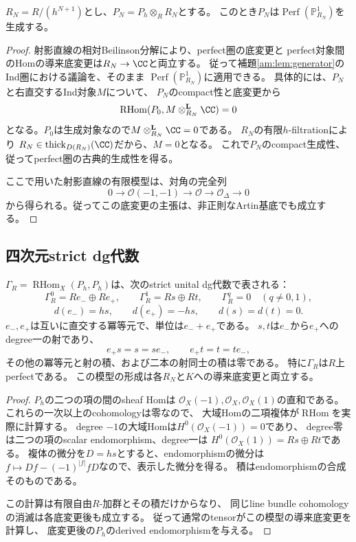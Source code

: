 \begin{lemma}[各有限切断では生成する]\label{as:lem:artin-generation}
$R_N=R/(h^{N+1})$とし、$P_N=P_h\otimes_RR_N$とする。
このとき$P_N$は$\operatorname{Perf}(\mathbb P^1_{R_N})$を生成する。
\end{lemma}
\begin{proof}
射影直線の相対Beilinson分解により、perfect圏の底変更と
perfect対象間のHomの導来底変更は$R_N\to\CC$と両立する。
従って補題\ref{am:lem:generator}のInd圏における議論を、そのまま
$\operatorname{Perf}(\mathbb P^1_{R_N})$に適用できる。
具体的には、$P_N$と右直交するInd対象$M$について、
$P_N$のcompact性と底変更から
\[
 \operatorname{RHom}(P_0,M\otimes_{R_N}^{\mathbf L}\CC)=0
\]
となる。$P_0$は生成対象なので$M\otimes_{R_N}^{\mathbf L}\CC=0$である。
$R_N$の有限$h$-filtrationにより
$R_N\in\operatorname{thick}_{D(R_N)}(\CC)$だから、$M=0$となる。
これで$P_N$のcompact生成性、従ってperfect圏の古典的生成性を得る。

ここで用いた射影直線の有限模型は、対角の完全列
\[
 0\longrightarrow\mathcal O(-1,-1)
 \longrightarrow\mathcal O
 \longrightarrow\mathcal O_\Delta\longrightarrow0
\]
から得られる。従ってこの底変更の主張は、非正則なArtin基底でも成立する。
\end{proof}

\subsection{四次元strict dg代数}

\begin{proposition}[底上properな明示的dg模型]\label{as:prop:dg-model}
$\Gamma_R=\operatorname{RHom}_X(P_h,P_h)$は、次のstrict unital dg代数で表される：
\begin{equation}\label{as:eq:dg-algebra}
 \Gamma_R^0=Re_-\oplus Re_+,\qquad
 \Gamma_R^1=Rs\oplus Rt,\qquad
 \Gamma_R^q=0\quad(q\ne0,1),
\end{equation}
\[
 d(e_-)=hs,\qquad d(e_+)=-hs,\qquad d(s)=d(t)=0.
\]
$e_-,e_+$は互いに直交する冪等元で、単位は$e_-+e_+$である。
$s,t$は$e_-$から$e_+$へのdegree一の射であり、
\[
 e_+s=s=se_-,\qquad e_+t=t=te_-,
\]
その他の冪等元と射の積、および二本の射同士の積は零である。
特に$\Gamma_R$は$R$上perfectである。
この模型の形成は各$R_N$と$K$への導来底変更と両立する。
\end{proposition}
\begin{proof}
$P_h$の二つの項の間のsheaf Homは
$\mathcal O_X(-1),\mathcal O_X,\mathcal O_X(1)$の直和である。
これらの一次以上のcohomologyは零なので、
大域Homの二項複体が$\operatorname{RHom}$を実際に計算する。
degree $-1$の大域Homは$H^0(\mathcal O_X(-1))=0$であり、
degree零は二つの項のscalar endomorphism、degree一は
$H^0(\mathcal O_X(1))=Rs\oplus Rt$である。
複体の微分を$D=hs$とすると、endomorphismの微分は
$f\mapsto Df-(-1)^{|f|}fD$なので、表示した微分を得る。
積はendomorphismの合成そのものである。

この計算は有限自由$R$-加群とその積だけからなり、
同じline bundle cohomologyの消滅は各底変更後も成立する。
従って通常のtensorがこの模型の導来底変更を計算し、
底変更後の$P_h$のderived endomorphismを与える。
\end{proof}


